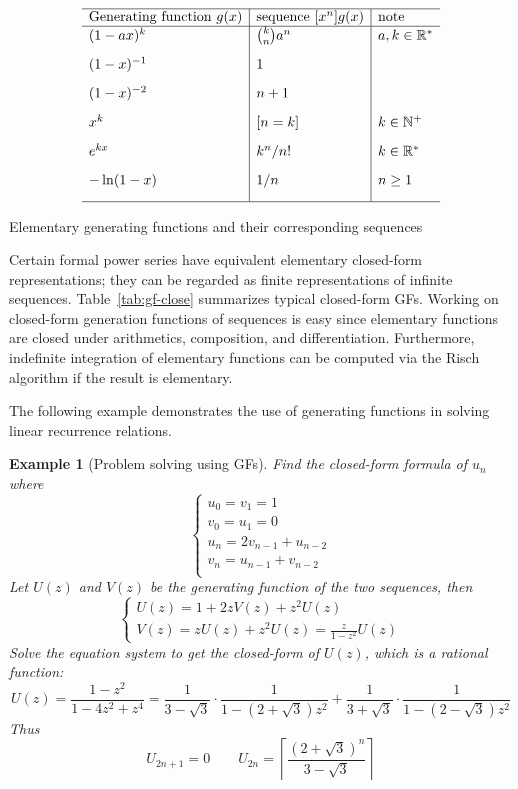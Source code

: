 \documentclass[a4paper]{article}
\newtheorem{example}[theorem]{Example}
\begin{document}
\begin{table}[htbp]
	\label{tab:gf-close}
	\[
		\begin{array}{l|l|l}
			\hline
			\text{Generating function }g(x) & \text{sequence }[x^n]g(x) & \text{note}             \\
			\hline
			(1-ax)^k                        & \binom{k}{n}a^n           & a,k\in\mathbb{R}^{\ast} \\[2ex]
			(1-x)^{-1}                      & 1                         &                         \\[2ex]
			(1-x)^{-2}                      & n+1                       &                         \\[2ex]
			x^k                             & [n=k]                     & k\in\mathbb{N}^{+}      \\[2ex]
			e^{kx}                          & k^n/n!                    & k\in\mathbb{R}^{\ast}   \\[2ex]
			-\ln(1-x)                       & 1/n                       & n\geq 1                 \\[2ex]
			\hline
		\end{array}
	\]
	\caption{Elementary generating functions and their corresponding sequences}
\end{table}
Certain formal power series have equivalent elementary closed-form representations; they can be regarded as finite representations of infinite sequences. Table~\ref{tab:gf-close} summarizes typical closed-form GFs.
Working on closed-form generation functions of sequences is easy since elementary functions are closed under arithmetics, composition, and differentiation.
Furthermore, indefinite integration of elementary functions can be computed via the Risch algorithm if the result is elementary.\par
The following example demonstrates the use of generating functions in solving linear recurrence relations.

\begin{example}[Problem solving using GFs]
	Find the closed-form formula of \(u_n\) where
	\[
		\begin{cases}
			u_0 = v_1 = 1            \\
			v_0 = u_1 = 0            \\
			u_n = 2v_{n-1} + u_{n-2} \\
			v_n =  u_{n-1} + v_{n-2} \\
		\end{cases}
	\]
	Let \(U(z)\) and \(V(z)\) be the generating function of the two sequences, then
	\[
		\begin{cases}
			U(z) = 1 + 2z V(z) + z^2 U(z) \\
			V(z) = zU(z)+z^2U(z) = \frac{z}{1-z^2}U(z)
		\end{cases}
	\]
	Solve the equation system to get the closed-form of \(U(z)\), which is a rational function:
	\[
		U(z)={\frac {1-z^{2}}{1-4z^{2}+z^{4}}}={\frac {1}{3-{\sqrt {3}}}}\cdot {\frac {1}{1-\left(2+{\sqrt {3}}\right)z^{2}}}+{\frac {1}{3+{\sqrt {3}}}}\cdot {\frac {1}{1-\left(2-{\sqrt {3}}\right)z^{2}}}
	\]
	Thus
	\[
		U_{2n+1} = 0 \qquad U_{2n} = \left\lceil \frac{(2+\sqrt 3)^n}{3-\sqrt 3} \right\rceil
	\]
\end{example}
\end{document}
